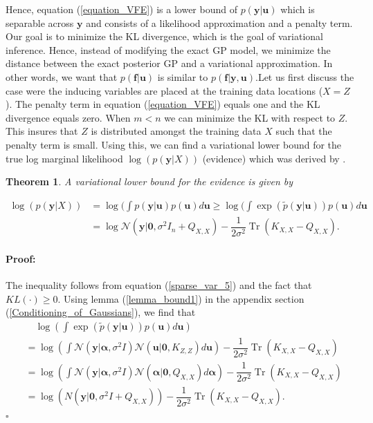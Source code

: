 \documentclass[12pt,a4paper,oneside]{book}
\newtheorem{Theorem}{Theorem}
\newenvironment{proof}{\paragraph{Proof:}}{\hfill$\square$}
\DeclareMathOperator{\Tr}{Tr}
\begin{document}
Hence, equation (\ref{equation_VFE}) is a lower bound of $p(\bm{y}|\bm{u})$ which is separable across $\bm{y}$ and consists of a likelihood approximation and a penalty term. Our goal is to minimize the KL divergence, which is the goal of variational inference. Hence, instead of modifying the exact GP model, we minimize the distance between the exact posterior GP and a variational approximation. In other words, we want that $p(\bm{f}|\bm{u})$ is similar to $p(\bm{f}|\bm{y}, \bm{u})$.Let us first discuss the case were the inducing variables are placed at the training data locations ($X = Z$). The penalty term in equation (\ref{equation_VFE}) equals one and the KL divergence equals zero. When $m<n$ we can minimize the KL with respect to $Z$. This insures that $Z$ is distributed amongst the training data $X$ such that the penalty term is small. Using this, we can find a variational lower bound for the true log marginal likelihood $\log{(p(\bm{y}|X))} $ (evidence) which was derived by \cite{titsias2009variational}. 

\begin{Theorem}
A variational lower bound for the evidence is given by

\begin{align}\label{sparse_var_3}
\log(p(\bm{y}|X)) &= \log( \int p(\bm{y}|\bm{u})p(\bm{u})d\bm{u} \geq \log(\int \exp(\tilde{p}(\bm{y}|\bm{u})) p(\bm{u}) d\bm{u} \nonumber \\
&= \log \mathcal{N} (\bm{y}|\bm{0},\sigma^2 I_n + Q_{X,X}) - \dfrac{1}{2 \sigma^2} \Tr (K_{X,X} - Q_{X,X}).
\end{align}

\end{Theorem}

\begin{proof}
The inequality follows from equation (\ref{sparse_var_5}) and the fact that $KL(\cdot) \geq 0$. Using lemma (\ref{lemma_bound1}) in the appendix section (\ref{Conditioning_of_Gaussians}), we find that 
\begin{align}
 & \quad \log(\int \exp(\tilde{p}(\bm{y}|\bm{u})) p(\bm{u}) d\bm{u}) \nonumber \\ &= \log \left( \int  \mathcal{N}(\bm{y} | \bm{\alpha}, \sigma^2 I ) \mathcal{N}(\bm{u} | \bm{0}, K_{Z,Z} ) d \bm{u} \right)  - \dfrac{1}{2 \sigma^2} \Tr ( K_{X,X} - Q_{X,X}) \nonumber \\   &= \log  \left( \int  \mathcal{N}(\bm{y} | \bm{\alpha}, \sigma^2 I ) \mathcal{N}(\bm{\alpha} | \bm{0}, Q_{X,X} ) d \bm{\alpha} \right)  - \dfrac{1}{2 \sigma^2} \Tr ( K_{X,X} - Q_{X,X}) \nonumber \\ &= \log {(N(\bm{y}|\bm{0}, \sigma^2 I + Q_{X,X}))- \dfrac{1}{2 \sigma^2} \Tr (K_{X,X} - Q_{X,X})}.
\end{align}
\end{proof}
\end{document}
